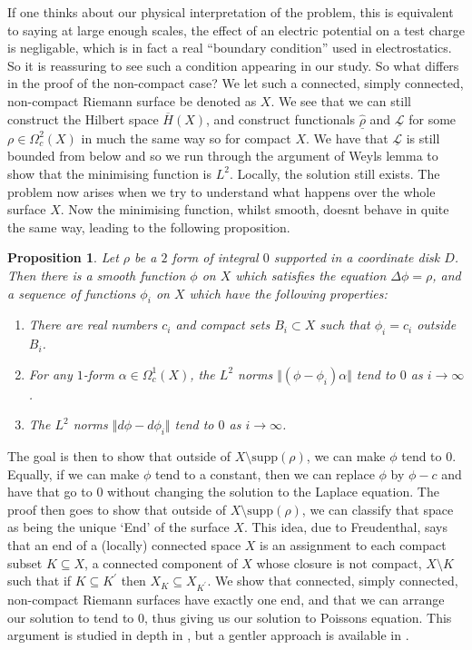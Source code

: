 \documentclass[11pt]{report}
\newtheorem{prop}[thm]{Proposition}
\theoremstyle{definition}
\begin{document}
If one thinks about our physical interpretation of the problem, this is equivalent to saying at large enough scales, the effect of an electric potential on a test charge is negligable, which is in fact a real ``boundary condition'' used in electrostatics. So it is reassuring to see such a condition appearing in our study. So what differs in the proof of the non-compact case? We let such a connected, simply connected, non-compact Riemann surface be denoted as $X$. We see that we can still construct the Hilbert space $\overline{H}(X)$, and construct functionals $\underline{\hat{\rho}}$ and $\underline{\mathcal{L}}$ for some $\rho \in \Omega^2_c(X)$ in much the same way so for compact $X$. We have that $\underline{\mathcal{L}}$ is still bounded from below and so we run through the argument of Weyls lemma to show that the minimising function is $L^2$. Locally, the solution still exists. The problem now arises when we try to understand what happens over the whole surface $X$. Now the minimising function, whilst smooth, doesnt behave in quite the same way, leading to the following proposition.
\begin{prop}\cite[Proposition 32]{donaldson}
  Let $\rho$ be a $2$ form of integral $0$ supported in a coordinate disk $D$. Then there is a smooth function $\phi$ on $X$ which satisfies the equation $\Delta \phi = \rho$, and a sequence of functions $\phi_i$ on $X$ which have the following properties:
  \begin{enumerate}
    \item There are real numbers $c_i$ and compact sets $B_i\subset X$ such that $\phi_i = c_i$ outside $B_i$.
    \item For any $1$-form $\alpha \in \Omega^1_c(X)$, the $L^2$ norms $\Vert(\phi - \phi_i)\alpha\Vert$ tend to $0$ as $i \rightarrow \infty$.
    \item The $L^2$ norms $\Vert d\phi -d\phi_i\Vert$ tend to $0$ as $i \rightarrow \infty$.
  \end{enumerate}
\end{prop}
The goal is then to show that outside of $X\setminus\text{supp}(\rho)$, we can make $\phi$ tend to $0$. Equally, if we can make $\phi$ tend to a constant, then we can replace $\phi$ by $\phi - c$ and have that go to $0$ without changing the solution to the Laplace equation. The proof then goes to show that outside of $X\setminus\text{supp}(\rho)$, we can classify that space as being the unique `End' of the surface $X$. This idea, due to Freudenthal, says that an end of a (locally) connected space $X$ is an assignment to each compact subset $K \subseteq X$, a connected component of $X$ whose closure is not compact, $X\setminus K$ such that if $K\subseteq K^{\prime}$ then $X_K \subseteq X_{K^{\prime}}$. We show that connected, simply connected, non-compact Riemann surfaces have exactly one end, and that we can arrange our solution to tend to $0$, thus giving us our solution to Poissons equation. This argument is studied in depth in \cite[Chapter 10]{donaldson}, but a gentler approach is available in \cite[p.32]{notes}.
\end{document}

